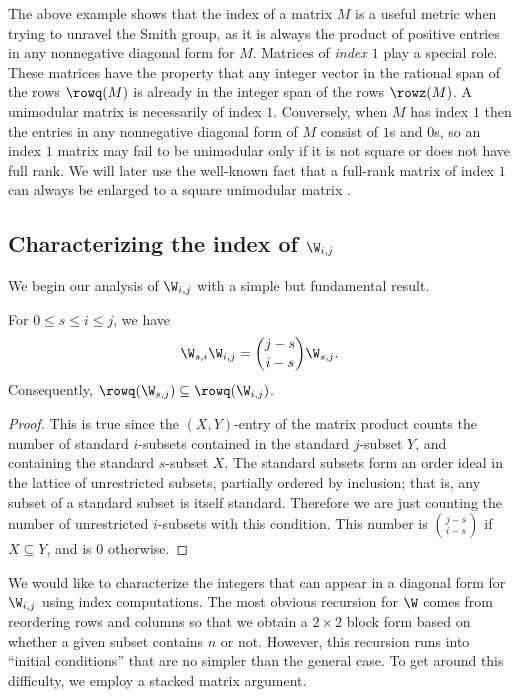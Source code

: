 The above example shows that the index of a matrix $M$ is a useful metric when trying to unravel the Smith group, as it is always the product of positive entries in any nonnegative diagonal form for $M$.  Matrices of {\em index $\mathit 1$} play a special role.  These matrices have the property that any integer vector in the rational span of the rows $\rowq(M)$ is already in the integer span of the rows $\rowz(M)$.  A unimodular matrix is necessarily of index $1$.  Conversely, when $M$ has index $1$ then the entries in any nonnegative diagonal form of $M$ consist of $1$s and $0$s, so an index $1$ matrix may fail to be unimodular only if it is not square or does not have full rank.  We will later use the well-known fact that a full-rank matrix of index $1$ can always be enlarged to a square unimodular matrix \cite[Proposition 2]{wilson_classic}.

\subsection{Characterizing the index of \texorpdfstring{$\W_{i,j}$}{Wij}}

We begin our analysis of $\W_{i,j}$ with a simple but fundamental result.

\begin{lemma}\label{l:fund}  For $0 \leq s \leq i \leq j$, we have
\begin{equation*}
\W_{s,i}\W_{i,j} = \binom{j-s}{i-s}\W_{s,j}.
\end{equation*}
Consequently, $\rowq(\W_{s,j}) \subseteq \rowq(\W_{i,j})$.
\end{lemma}
\begin{proof}
This is true since the $(X,Y)$-entry of the matrix product counts the number of standard $i$-subsets contained in the standard $j$-subset $Y$, and containing the standard $s$-subset $X$.  The standard subsets form an order ideal in the lattice of unrestricted subsets, partially ordered by inclusion; that is, any subset of a standard subset is itself standard.  Therefore we are just counting the number of unrestricted $i$-subsets with this condition.  This number is $\binom{j-s}{i-s}$ if $X \subseteq Y$, and is $0$ otherwise.
\end{proof}

We would like to characterize the integers that can appear in a diagonal form for $\W_{i,j}$ using index computations.  The most obvious recursion for $\W$ comes from reordering rows and columns so that we obtain a $2 \times 2$ block form based on whether a given subset contains $n$ or not.  However, this recursion runs into ``initial conditions'' that are no simpler than the general case.  To get around this difficulty, we employ a stacked matrix argument.  

